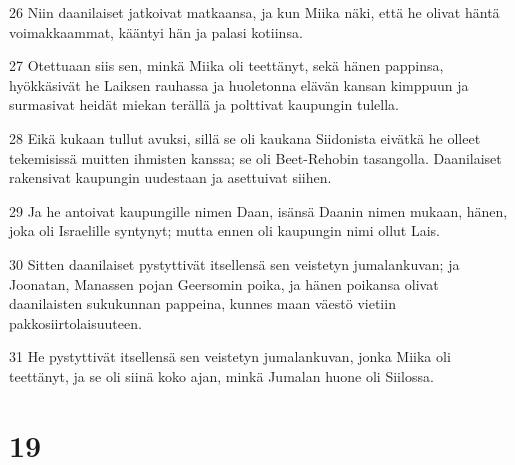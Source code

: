 \par 26 Niin daanilaiset jatkoivat matkaansa, ja kun Miika näki, että he olivat häntä voimakkaammat, kääntyi hän ja palasi kotiinsa.
\par 27 Otettuaan siis sen, minkä Miika oli teettänyt, sekä hänen pappinsa, hyökkäsivät he Laiksen rauhassa ja huoletonna elävän kansan kimppuun ja surmasivat heidät miekan terällä ja polttivat kaupungin tulella.
\par 28 Eikä kukaan tullut avuksi, sillä se oli kaukana Siidonista eivätkä he olleet tekemisissä muitten ihmisten kanssa; se oli Beet-Rehobin tasangolla. Daanilaiset rakensivat kaupungin uudestaan ja asettuivat siihen.
\par 29 Ja he antoivat kaupungille nimen Daan, isänsä Daanin nimen mukaan, hänen, joka oli Israelille syntynyt; mutta ennen oli kaupungin nimi ollut Lais.
\par 30 Sitten daanilaiset pystyttivät itsellensä sen veistetyn jumalankuvan; ja Joonatan, Manassen pojan Geersomin poika, ja hänen poikansa olivat daanilaisten sukukunnan pappeina, kunnes maan väestö vietiin pakkosiirtolaisuuteen.
\par 31 He pystyttivät itsellensä sen veistetyn jumalankuvan, jonka Miika oli teettänyt, ja se oli siinä koko ajan, minkä Jumalan huone oli Siilossa.

\chapter{19}

